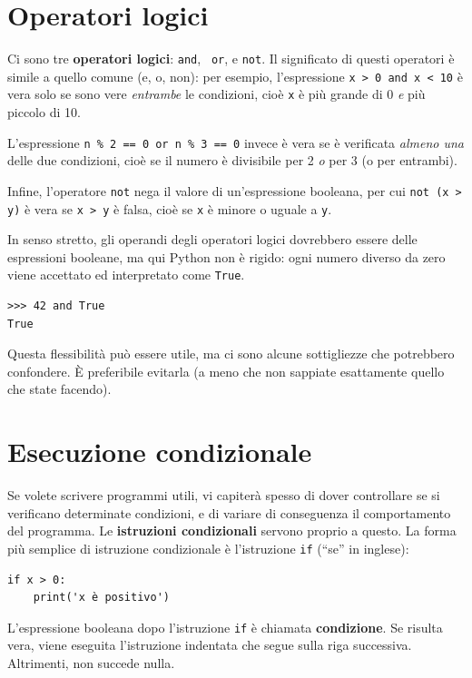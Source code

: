 \documentclass[10pt]{book}
\begin{document}
\section {Operatori logici}

Ci sono tre {\bf operatori logici}: {\tt and}, {\tt
or}, e {\tt not}.  Il significato di questi operatori è simile a quello comune (e, o, non): per esempio, l'espressione {\tt x > 0 and x < 10} è vera solo se sono vere {\em entrambe} le condizioni, cioè {\tt x} è più grande di 0 {\em e} più piccolo di 10.

L'espressione {\tt n \% 2 == 0 or n \% 3 == 0} invece è vera se è verificata {\em almeno una} delle due condizioni, cioè se il numero è divisibile per 2 {\em o} per 3 (o per entrambi).

Infine, l'operatore {\tt not} nega il valore di un'espressione booleana, per cui {\tt not (x > y)} è vera se {\tt x > y} è falsa, cioè se {\tt x} è minore o uguale a {\tt y}.

In senso stretto, gli operandi degli operatori logici dovrebbero essere delle espressioni booleane, ma qui Python non è rigido: ogni numero diverso da zero viene accettato ed interpretato come {\tt True}.

\begin{verbatim}
>>> 42 and True
True
\end{verbatim}
%
Questa flessibilità può essere utile, ma ci sono alcune sottigliezze che potrebbero confondere. È preferibile evitarla (a meno che non sappiate esattamente quello che state facendo).


\section{Esecuzione condizionale}
\label{conditional.execution}

Se volete scrivere programmi utili, vi capiterà spesso di dover controllare se si verificano determinate condizioni, e di variare di conseguenza il comportamento del programma. Le {\bf istruzioni condizionali} servono proprio a questo. La forma più semplice di istruzione condizionale è l'istruzione {\tt if} (``se'' in inglese):

\begin{verbatim}
if x > 0:
    print('x è positivo')
\end{verbatim}
%
L'espressione booleana dopo l'istruzione {\tt if} è chiamata {\bf condizione}.  Se risulta vera, viene eseguita l'istruzione indentata che segue sulla riga successiva. Altrimenti, non succede nulla.
\end{document}
